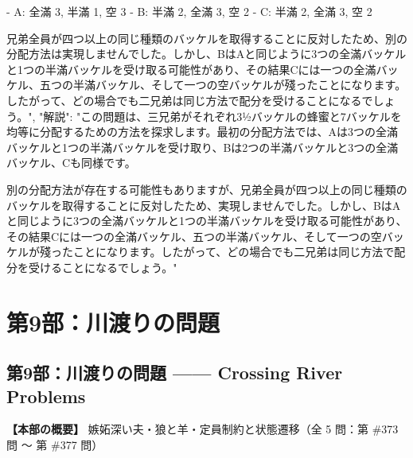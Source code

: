\documentclass[10pt,a4paper,oneside,openany]{ltjsbook}
\begin{document}
\begin{tcolorbox}[colback=softblue,colframe=primaryblue,title=\textbf{第 372 問：THE BARRELS OF HONEY.},arc=2mm,boxrule=1pt,breakable]
{- A: 全滿 3, 半滿 1, 空 3
- B: 半滿 2, 全滿 3, 空 2
- C: 半滿 2, 全滿 3, 空 2

兄弟全員が四つ以上の同じ種類のバッケルを取得することに反対したため、別の分配方法は実現しませんでした。しかし、BはAと同じように3つの全滿バッケルと1つの半滿バッケルを受け取る可能性があり、その結果Cには一つの全滿バッケル、五つの半滿バッケル、そして一つの空バッケルが殘ったことになります。したがって、どの場合でも二兄弟は同じ方法で配分を受けることになるでしょう。",
  "解説": "この問題は、三兄弟がそれぞれ3½バッケルの蜂蜜と7バッケルを均等に分配するための方法を探求します。最初の分配方法では、Aは3つの全滿バッケルと1つの半滿バッケルを受け取り、Bは2つの半滿バッケルと3つの全滿バッケル、Cも同様です。

別の分配方法が存在する可能性もありますが、兄弟全員が四つ以上の同じ種類のバッケルを取得することに反対したため、実現しませんでした。しかし、BはAと同じように3つの全滿バッケルと1つの半滿バッケルを受け取る可能性があり、その結果Cには一つの全滿バッケル、五つの半滿バッケル、そして一つの空バッケルが殘ったことになります。したがって、どの場合でも二兄弟は同じ方法で配分を受けることになるでしょう。"
}
\end{tcolorbox}

\part{第9部：川渡りの問題}
\chapter*{第9部：川渡りの問題 —— Crossing River Problems}

\textbf{【本部の概要】} 嫉妬深い夫・狼と羊・定員制約と状態遷移（全 5 問：第 \#373 問 〜 第 \#377 問）

\vspace{1em}
\end{document}
